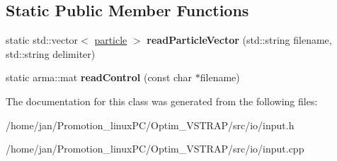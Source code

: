 \subsection*{Static Public Member Functions}
\begin{DoxyCompactItemize}
\item 
\mbox{\label{classinput_aa52f1efda75b6a38b8058ec4731e4a5c}} 
static std\+::vector$<$ \hyperlink{classparticle}{particle} $>$ {\bfseries read\+Particle\+Vector} (std\+::string filename, std\+::string delimiter)
\item 
\mbox{\label{classinput_abc407f396e45ac72844e65cb73cfb335}} 
static arma\+::mat {\bfseries read\+Control} (const char $\ast$filename)
\end{DoxyCompactItemize}


The documentation for this class was generated from the following files\+:\begin{DoxyCompactItemize}
\item 
/home/jan/\+Promotion\+\_\+linux\+P\+C/\+Optim\+\_\+\+V\+S\+T\+R\+A\+P/src/io/input.\+h\item 
/home/jan/\+Promotion\+\_\+linux\+P\+C/\+Optim\+\_\+\+V\+S\+T\+R\+A\+P/src/io/input.\+cpp\end{DoxyCompactItemize}
